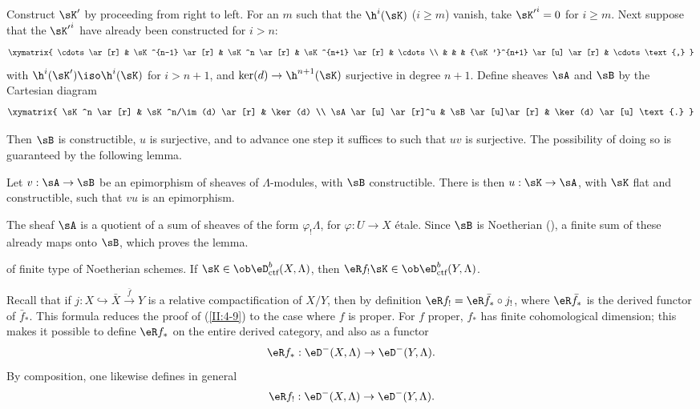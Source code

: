 Construct $\sK'$ by proceeding from right to left. For an $m$ such that the
$\h^i(\sK)$ ($i\geqslant m$) vanish, take ${\sK'}^i = 0$ for
$i\geqslant m$. Next suppose that the ${\sK'}^i$ have already been
constructed for $i>n$:
\[\xymatrix{
  \cdots \ar[r]
    & \sK^{n-1} \ar[r]
    & \sK^n \ar[r]
    & \sK^{n+1} \ar[r]
    & \cdots \\
  & & & {\sK'}^{n+1} \ar[u] \ar[r]
    & \cdots \text{,}
}\]
with $\h^i(\sK')\iso \h^i(\sK)$ for $i>n+1$, and
$\ker(d)\to\h^{n+1}(\sK)$ surjective in degree $n+1$. Define sheaves $\sA$
and $\sB$ by the Cartesian diagram
\[\xymatrix{
  \sK^n \ar[r]
    & \sK^n/\im(d) \ar[r]
    & \ker(d) \\
  \sA \ar[u] \ar[r]^u
    & \sB \ar[u]\ar[r]
    & \ker(d) \ar[u] \text{.}
}\]

Then $\sB$ is constructible, $u$ is surjective, and to advance one step it
suffices to  such that $u v$ is surjective. The possibility of doing so
is guaranteed by the following lemma.






\begin{lemma_}\label{II:4-8}
Let $v:\sA\to \sB$ be an epimorphism of sheaves of $\Lambda$-modules, with
$\sB$ constructible. There is then $u:\sK\to \sA$, with $\sK$ flat and
constructible, such that $v u$ is an epimorphism.
\end{lemma_}

The sheaf $\sA$ is a quotient of a sum of sheaves of the form
$\varphi_! \Lambda$, for $\varphi:U\to X$ étale. Since $\sB$ is Noetherian
(\cite[IX.2.10]{sga4}), a finite sum of these already maps onto $\sB$, which
proves the lemma.






\begin{theorem_}\label{II:4-9}
 of finite type of Noetherian schemes.
If $\sK\in\ob\eD_\textnormal{ctf}^b(X,\Lambda)$, then
$\eR f_!\sK\in \ob\eD_\textnormal{ctf}^b(Y,\Lambda)$.
\end{theorem_}

Recall that if $j:X\hookrightarrow \bar X \xrightarrow{\bar f} Y$ is a
relative compactification of $X/Y$, then by definition
$\eR f_! = \eR \bar f_* \circ j_!$, where $\eR \bar f_*$ is the derived
functor of $\bar f_*$. This formula reduces the proof of (\ref{II:4-9}) to
the case where $f$ is proper. For $f$ proper, $f_*$ has finite cohomological
dimension; this makes it possible to define $\eR f_*$ on the entire derived
category, and also as a functor
\[
  \eR f_* : \eD^-(X,\Lambda) \to \eD^-(Y,\Lambda) \text{.}
\]
By composition, one likewise defines in general
\[
  \eR f_! : \eD^-(X,\Lambda) \to \eD^-(Y,\Lambda) \text{.}
\]

